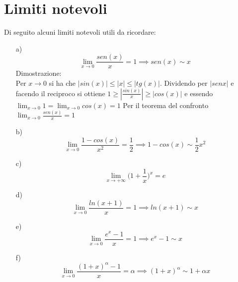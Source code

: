 \section{Limiti notevoli}
Di seguito alcuni limiti notevoli utili da ricordare:
\begin{enumerate}
\item[a)] \begin{equation} \displaystyle \lim_{x \to 0}\frac{sen(x)}{x} = 1 \implies sen(x) \sim x
\end{equation}
Dimostrazione:\\
Per $x \to 0$ si ha che $|sin(x)| \leq |x| \leq |tg(x)|$. Dividendo per $|senx|$ e facendo il reciproco si ottiene $1 \geq |\frac{sin(x)}{x}| \geq |cos(x)|$ e essendo $\displaystyle \lim_{x \to 0}1 = \lim_{x \to 0}cos(x) = 1$ Per il teorema del confronto $\displaystyle \lim_{x \to 0}\frac{sen(x)}{x} = 1$
\item[b)] \begin{equation} \displaystyle \lim_{x \to 0}\frac{1 - cos(x)}{x^2} = \frac{1}{2} \implies 1 - cos(x) \sim \frac{1}{2}x^2
\end{equation}
\item[c)] \begin{equation} \displaystyle \lim_{x \to +\infty}\biggl (1 + \frac{1}{x} \biggl )^x = e
\end{equation}
\item[d)] \begin{equation} \displaystyle \lim_{x \to 0}\frac{ln(x+1)}{x} = 1 \implies ln(x + 1) \sim x
\end{equation}
\item[e)] \begin{equation} \displaystyle \lim_{x \to 0}\frac{e^x - 1}{x} = 1 \implies e^x - 1 \sim x
\end{equation}
\item[f)] \begin{equation} \displaystyle \lim_{x \to 0}\frac{(1 + x)^\alpha - 1}{x} = \alpha \implies (1 + x)^\alpha \sim 1 + \alpha x
\end{equation}
\end{enumerate}
